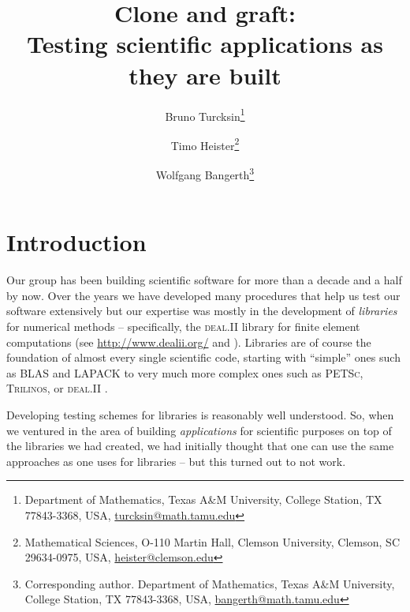 \documentclass{article}
\newcommand{\dealii}{{\textsc{deal.II}}}
\newcommand{\trilinos}{{\textsc{Trilinos}}}
\newcommand{\petsc}{\textsc{PETSc}}
\begin{document}

\title{Clone and graft:\\ Testing scientific
  applications as they are built}

\author{Bruno Turcksin\footnote{Department of Mathematics, Texas A\&M
    University, College Station, TX 77843-3368, USA, \url{turcksin@math.tamu.edu}}
\and
   Timo Heister\footnote{Mathematical Sciences, O-110 Martin Hall, Clemson University,
     Clemson, SC 29634-0975, USA, \url{heister@clemson.edu}}
\and
   Wolfgang Bangerth\footnote{Corresponding author. Department of Mathematics, Texas A\&M
     University, College Station, TX 77843-3368, USA, \url{bangerth@math.tamu.edu}}}


\maketitle

\section{Introduction}

Our group has been building scientific software for more than a decade and a
half by now. Over the years we have developed many procedures that help us
test our software extensively but our expertise was mostly in the development
of \textit{libraries} for numerical methods -- specifically, the \dealii{}
library for finite element computations (see
\url{http://www.dealii.org/} and \cite{BHK07,BK99m}). Libraries are of course the foundation of
almost every single scientific code, starting with ``simple'' ones such as
BLAS and LAPACK to very much more complex ones such as \petsc{}, \trilinos{}, or
\dealii{} \cite{petsc,trilinos,trilinos-web-page}.

Developing testing schemes for libraries is reasonably well understood. So,
when we ventured in the area of building \textit{applications} for scientific purposes
on top of the libraries we had created, we had initially thought that one can
use the same approaches as one uses for libraries -- but this turned out to
not work.
\end{document}
